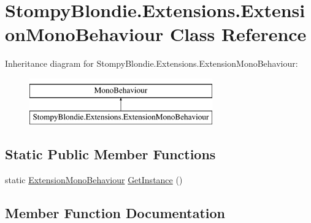 \hypertarget{class_stompy_blondie_1_1_extensions_1_1_extension_mono_behaviour}{}\section{Stompy\+Blondie.\+Extensions.\+Extension\+Mono\+Behaviour Class Reference}
\label{class_stompy_blondie_1_1_extensions_1_1_extension_mono_behaviour}
Inheritance diagram for Stompy\+Blondie.\+Extensions.\+Extension\+Mono\+Behaviour\+:\begin{figure}[H]
\begin{center}
\leavevmode
\includegraphics[height=2.000000cm]{class_stompy_blondie_1_1_extensions_1_1_extension_mono_behaviour}
\end{center}
\end{figure}
\subsection*{Static Public Member Functions}
\begin{DoxyCompactItemize}
\item 
static \mbox{\hyperlink{class_stompy_blondie_1_1_extensions_1_1_extension_mono_behaviour}{Extension\+Mono\+Behaviour}} \mbox{\hyperlink{class_stompy_blondie_1_1_extensions_1_1_extension_mono_behaviour_a472cd1f5e863bf9d36b7a455167f2b97}{Get\+Instance}} ()
\end{DoxyCompactItemize}


\subsection{Member Function Documentation}
\mbox{\label{class_stompy_blondie_1_1_extensions_1_1_extension_mono_behaviour_a472cd1f5e863bf9d36b7a455167f2b97}} 
